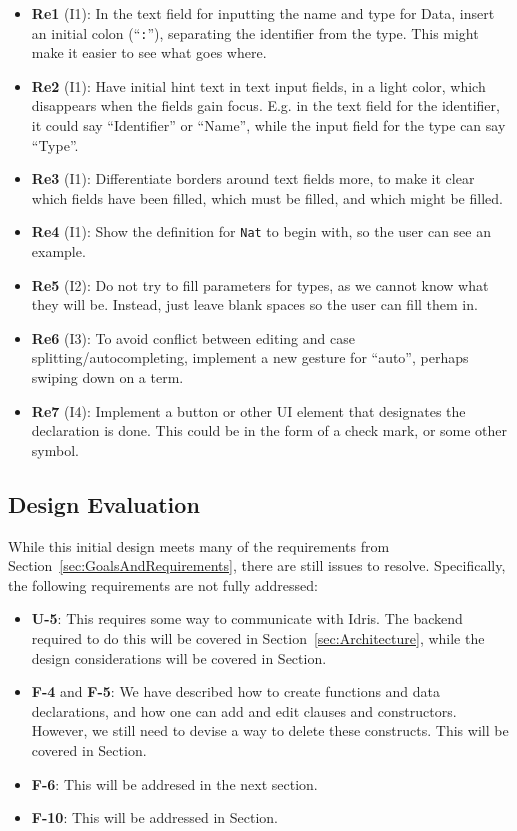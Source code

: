 \begin{itemize}
	\item \textbf{Re1} (I1): In the text field for inputting the name and type for Data, insert an initial colon (``\texttt{:}''), separating the identifier from the type. This might make it easier to see what goes where.
	\item \textbf{Re2} (I1): Have initial hint text in text input fields, in a light color, which disappears when the fields gain focus. E.g. in the text field for the identifier, it could say ``Identifier'' or ``Name'', while the input field for the type can say ``Type''.
	\item \textbf{Re3} (I1): Differentiate borders around text fields more, to make it clear which fields have been filled, which must be filled, and which might be filled.
	\item \textbf{Re4} (I1): Show the definition for \texttt{Nat} to begin with, so the user can see an example.
	\item \textbf{Re5} (I2): Do not try to fill parameters for types, as we cannot know what they will be. Instead, just leave blank spaces so the user can fill them in.
	\item \textbf{Re6} (I3): To avoid conflict between editing and case splitting/autocompleting, implement a new gesture for ``auto'', perhaps swiping down on a term.
	\item \textbf{Re7} (I4): Implement a button or other UI element that designates the declaration is done. This could be in the form of a check mark, or some other symbol.
\end{itemize}


\subsection{Design Evaluation}
\label{subsec:first_design_evaluation}
While this initial design meets many of the requirements from Section~\ref{sec:GoalsAndRequirements}, there are still issues to resolve.
Specifically, the following requirements are not fully addressed:
\begin{itemize}
	\item \textbf{U-5}: This requires some way to communicate with Idris. The backend required to do this will be covered in Section~\ref{sec:Architecture}, while the design considerations will be covered in Section.
	\item \textbf{F-4} and \textbf{F-5}: We have described how to create functions and data declarations, and how one can add and edit clauses and constructors. However, we still need to devise a way to delete these constructs. This will be covered in Section.
	\item \textbf{F-6}: This will be addresed in the next section.
	\item \textbf{F-10}: This will be addressed in Section.
\end{itemize}

